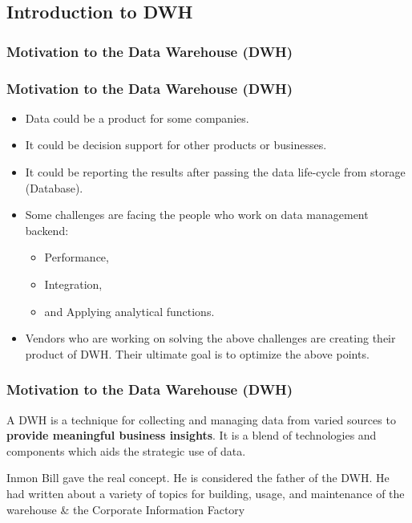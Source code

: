 \VideoClassification[column=2, colour=blue]
\subsection{Introduction to DWH}

\subsubsection{Motivation to the Data Warehouse (DWH)}
\begin{frame}
\frametitle{Motivation to the Data Warehouse (DWH)}
	\begin{itemize}[<+->]
		\item Data could be a product for some companies.
		\item It could be decision support for other products or businesses.
		\item It could be reporting the results after passing the data life-cycle from storage (Database).
		\item Some challenges are facing the people who work on data management backend:
			\begin{itemize}[<+->]
				\item Performance,
				\item Integration,
				\item and Applying analytical functions. %
			\end{itemize}
		\item Vendors who are working on solving the above challenges are creating their product of DWH. Their ultimate goal is to optimize the above points.
	\end{itemize}
\end{frame}
\begin{frame}[c]
\frametitle{Motivation to the Data Warehouse (DWH)}

\begin{definition} A DWH is a technique for collecting and managing data from varied sources to \textbf{provide meaningful business insights}. It is a blend of technologies and components which aids the strategic use of data.%
\end{definition}

Inmon Bill gave the real concept. He is considered the father of the DWH. He had written about a variety of topics for building, usage, and maintenance of the warehouse \& the Corporate Information Factory


\end{frame}

